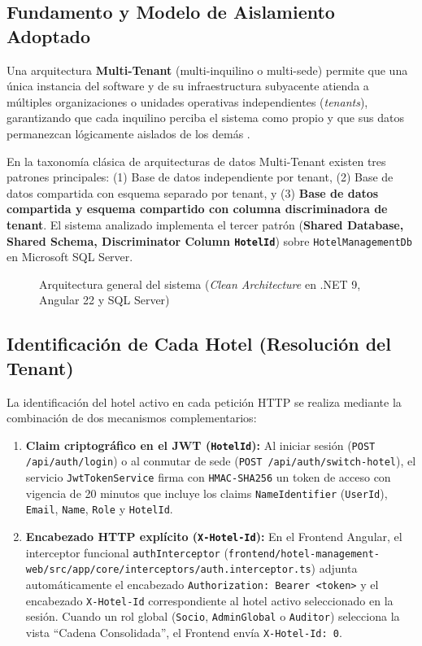 \documentclass[12pt,a4paper]{article}
\begin{document}
\subsection{Fundamento y Modelo de Aislamiento Adoptado}
Una arquitectura \textbf{Multi-Tenant} (multi-inquilino o multi-sede) permite que una \'unica instancia del software y de su infraestructura subyacente atienda a m\'ultiples organizaciones o unidades operativas independientes (\textit{tenants}), garantizando que cada inquilino perciba el sistema como propio y que sus datos permanezcan l\'ogicamente aislados de los dem\'as \cite{chong2006multitenant}.

En la taxonom\'ia cl\'asica de arquitecturas de datos Multi-Tenant existen tres patrones principales: (1) Base de datos independiente por tenant, (2) Base de datos compartida con esquema separado por tenant, y (3) \textbf{Base de datos compartida y esquema compartido con columna discriminadora de tenant}. El sistema analizado implementa el tercer patr\'on (\textbf{Shared Database, Shared Schema, Discriminator Column \texttt{HotelId}}) sobre \texttt{HotelManagementDb} en Microsoft SQL Server.

\begin{figure}[H]
    \centering
    
    \caption{Arquitectura general del sistema (\textit{Clean Architecture} en .NET 9, Angular 22 y SQL Server)}
    \label{fig:arquitectura_general}
\end{figure}

\subsection{Identificaci\'on de Cada Hotel (Resoluci\'on del Tenant)}
La identificaci\'on del hotel activo en cada petici\'on HTTP se realiza mediante la combinaci\'on de dos mecanismos complementarios:
\begin{enumerate}
    \item \textbf{Claim criptogr\'afico en el JWT (\texttt{HotelId}):} Al iniciar sesi\'on (\texttt{POST /api/auth/login}) o al conmutar de sede (\texttt{POST /api/auth/switch-hotel}), el servicio \texttt{JwtTokenService} firma con \texttt{HMAC-SHA256} un token de acceso con vigencia de 20 minutos que incluye los claims \texttt{NameIdentifier} (\texttt{UserId}), \texttt{Email}, \texttt{Name}, \texttt{Role} y \texttt{HotelId}.
    \item \textbf{Encabezado HTTP expl\'icito (\texttt{X-Hotel-Id}):} En el Frontend Angular, el interceptor funcional \texttt{authInterceptor} (\texttt{frontend/hotel-management-web/src/app/core/interceptors/auth.interceptor.ts}) adjunta autom\'aticamente el encabezado \texttt{Authorization: Bearer <token>} y el encabezado \texttt{X-Hotel-Id} correspondiente al hotel activo seleccionado en la sesi\'on. Cuando un rol global (\texttt{Socio}, \texttt{AdminGlobal} o \texttt{Auditor}) selecciona la vista ``Cadena Consolidada'', el Frontend env\'ia \texttt{X-Hotel-Id: 0}.
\end{enumerate}
\end{document}
